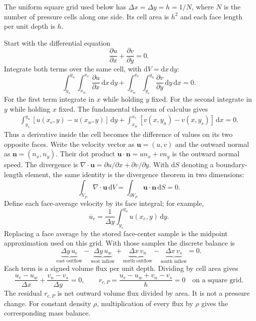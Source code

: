 The uniform square grid used below has $\Delta x=\Delta y=h=1/N$, where $N$
is the number of pressure cells along one side. Its cell area is $h^2$ and
each face length per unit depth is $h$.
\newpage

\newpage
{}
Start with the differential equation
\[
\frac{\partial u}{\partial x}+\frac{\partial v}{\partial y}=0.
\]
Integrate both terms over the same cell, with $\mathrm dV=\mathrm dx\,\mathrm dy$:
\[
\int_{y_s}^{y_n}\int_{x_w}^{x_e}\frac{\partial u}{\partial x}\,\mathrm dx\,\mathrm dy
+\int_{x_w}^{x_e}\int_{y_s}^{y_n}\frac{\partial v}{\partial y}\,\mathrm dy\,\mathrm dx=0.
\]
For the first term integrate in $x$ while holding $y$ fixed. For the second
integrate in $y$ while holding $x$ fixed. The fundamental theorem of calculus gives
\begin{align*}
\int_{y_s}^{y_n}[u(x_e,y)-u(x_w,y)]\,\mathrm dy
+\int_{x_w}^{x_e}[v(x,y_n)-v(x,y_s)]\,\mathrm dx=0.
\end{align*}
Thus a derivative inside the cell becomes the difference of values on its two
opposite faces. Write the velocity vector as $\boldsymbol u=(u,v)$ and the
outward normal as $\boldsymbol n=(n_x,n_y)$. Their dot product
$\boldsymbol u\cdot\boldsymbol n=un_x+vn_y$ is the outward normal speed.
The divergence is $\nabla\cdot\boldsymbol u=\partial u/\partial x+\partial v/\partial y$.
With $\mathrm dS$ denoting a boundary-length element, the same identity is the
divergence theorem in two dimensions:
\[
\int_{V_P}\nabla\cdot\boldsymbol u\,\mathrm dV
=\int_{\partial V_P}\boldsymbol u\cdot\boldsymbol n\,\mathrm dS=0.
\]
Define each face-average
velocity by its face integral; for example,
\[
\overline u_e=\frac{1}{\Delta y}\int_{y_s}^{y_n}u(x_e,y)\,\mathrm dy.
\]
Replacing a face average by the stored face-center sample is the midpoint
approximation used on this grid. With those samples the discrete balance is
\[
\underbrace{\Delta y\,u_e}_{\text{east outflow}}
-\underbrace{\Delta y\,u_w}_{\text{west inflow}}
+\underbrace{\Delta x\,v_n}_{\text{north outflow}}
-\underbrace{\Delta x\,v_s}_{\text{south inflow}}=0.
\]
Each term is a signed volume flux per unit depth. Dividing by cell area gives
\[
\frac{u_e-u_w}{\Delta x}+\frac{v_n-v_s}{\Delta y}=0,
\qquad
\boxed{r_{c,P}=\frac{u_e-u_w+v_n-v_s}{h}=0\quad\text{on a square grid}.}
\]
The residual $r_{c,P}$ is net outward volume flux divided by area. It is not a
pressure change. For constant density $\rho$, multiplication of every flux by
$\rho$ gives the corresponding mass balance.

